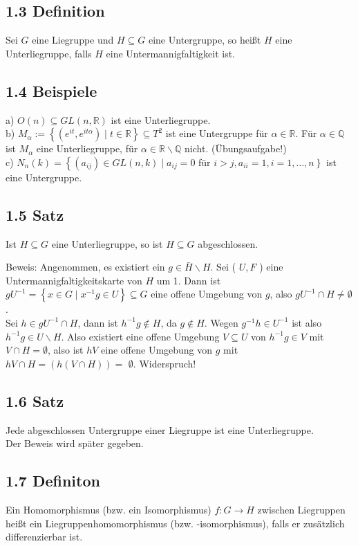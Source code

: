\documentclass[10pt, letterpaper]{article}
\begin{document}
\subsection*{1.3 Definition}
Sei $G$ eine Liegruppe und $H \subseteq G$ eine Untergruppe, so heißt $H$ eine Unterliegruppe, falls $H$ eine Untermannigfaltigkeit ist.

\subsection*{1.4 Beispiele}
a) $O(n) \subseteq G L(n, \mathbb{R})$ ist eine Unterliegruppe.\\
b) $M_{\alpha}:=\left\{\left(e^{i t}, e^{i t \alpha}\right) \mid t \in \mathbb{R}\right\} \subseteq T^{2}$ ist eine Untergruppe für $\alpha \in \mathbb{R}$. Für $\alpha \in \mathbb{Q}$ ist $M_{\alpha}$ eine Unterliegruppe, für $\alpha \in \mathbb{R} \backslash \mathbb{Q}$ nicht. (Übungsaufgabe!)\\
c) $N_{n}(k)=\left\{\left(a_{i j}\right) \in G L(n, k) \mid a_{i j}=0\right.$ für $\left.i>j, a_{i i}=1, i=1, \ldots, n\right\}$ ist eine Untergruppe.

\subsection*{1.5 Satz}
Ist $H \subseteq G$ eine Unterliegruppe, so ist $H \subseteq G$ abgeschlossen.

Beweis: Angenommen, es existiert ein $g \in \bar{H} \backslash H$. Sei ( $U, F$ ) eine Untermannigfaltigkeitskarte von $H$ um 1. Dann ist $g U^{-1}=\left\{x \in G \mid x^{-1} g \in U\right\} \subseteq G$ eine offene Umgebung von $g$, also $g U^{-1} \cap H \neq \emptyset$.\\
Sei $h \in g U^{-1} \cap H$, dann ist $h^{-1} g \notin H$, da $g \notin H$. Wegen $g^{-1} h \in U^{-1}$ ist also $h^{-1} g \in U \backslash H$. Also existiert eine offene Umgebung $V \subseteq U$ von $h^{-1} g \in V$ mit $V \cap H=\emptyset$, also ist $h V$ eine offene Umgebung von $g$ mit $h V \cap H=(h(V \cap H))=$ $\emptyset$. Widerspruch!

\subsection*{1.6 Satz}
Jede abgeschlossen Untergruppe einer Liegruppe ist eine Unterliegruppe.\\
Der Beweis wird später gegeben.

\subsection*{1.7 Definiton}
Ein Homomorphismus (bzw. ein Isomorphismus) $f: G \rightarrow H$ zwischen Liegruppen heißt ein Liegruppenhomomorphismus (bzw. -isomorphismus), falls er zusätzlich differenzierbar ist.
\end{document}
